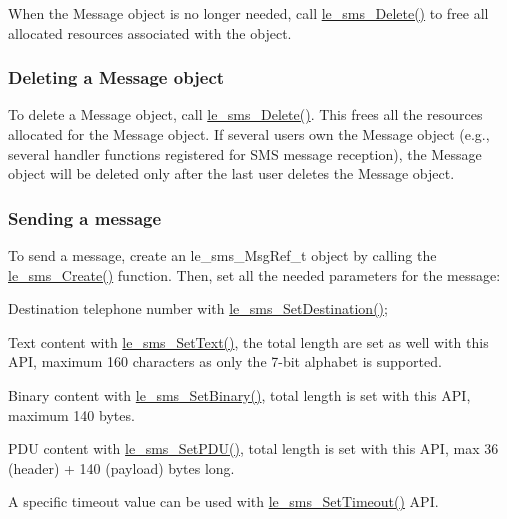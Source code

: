 When the Message object is no longer needed, call {\ttfamily \hyperlink{le__sms__interface_8h_aca1691010c88995cb47225f2889910fa}{le\+\_\+sms\+\_\+\+Delete()}} to free all allocated resources associated with the object.\hypertarget{c_sms_le_sms_ops_deleting_msg}{}\subsubsection{Deleting a Message object}\label{c_sms_le_sms_ops_deleting_msg}
To delete a Message object, call \hyperlink{le__sms__interface_8h_aca1691010c88995cb47225f2889910fa}{le\+\_\+sms\+\_\+\+Delete()}. This frees all the resources allocated for the Message object. If several users own the Message object (e.\+g., several handler functions registered for S\+M\+S message reception), the Message object will be deleted only after the last user deletes the Message object.\hypertarget{c_sms_le_sms_ops_sending}{}\subsubsection{Sending a message}\label{c_sms_le_sms_ops_sending}
To send a message, create an {\ttfamily le\+\_\+sms\+\_\+\+Msg\+Ref\+\_\+t} object by calling the {\ttfamily \hyperlink{le__sms__interface_8h_a668abcbcff2f1f3c5cdf799315a81058}{le\+\_\+sms\+\_\+\+Create()}} function. Then, set all the needed parameters for the message\+:
\begin{DoxyItemize}
\item Destination telephone number with \hyperlink{le__sms__interface_8h_a145d3215f5601b88ef80b2674a9df226}{le\+\_\+sms\+\_\+\+Set\+Destination()};
\item Text content with \hyperlink{le__sms__interface_8h_a34dc999430c46530d6c9067f800c5d72}{le\+\_\+sms\+\_\+\+Set\+Text()}, the total length are set as well with this A\+P\+I, maximum 160 characters as only the 7-\/bit alphabet is supported.
\item Binary content with \hyperlink{le__sms__interface_8h_a2abf46b6d57c473bb06caf701a04183e}{le\+\_\+sms\+\_\+\+Set\+Binary()}, total length is set with this A\+P\+I, maximum 140 bytes.
\item P\+D\+U content with \hyperlink{le__sms__interface_8h_ab7295e1cdf2adb865135d657ec8bde09}{le\+\_\+sms\+\_\+\+Set\+P\+D\+U()}, total length is set with this A\+P\+I, max 36 (header) + 140 (payload) bytes long.
\item A specific timeout value can be used with \hyperlink{le__sms__interface_8h_a2b14febf0e2285b0b3c2dbcd1c2bb7b0}{le\+\_\+sms\+\_\+\+Set\+Timeout()} A\+P\+I.
\end{DoxyItemize}


